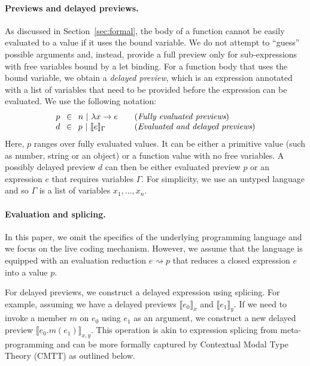 \documentclass[sigplan,10pt]{acmart}\settopmatter{printfolios=true,printccs=false,printacmref=false}
\theoremstyle{plain}
\theoremstyle{definition}
\begin{document}
\paragraph{Previews and delayed previews.}
As discussed in Section~\ref{sec:formal}, the body of a function cannot be easily evaluated to
a value if it uses the bound variable. We do not attempt to ``guess'' possible arguments and,
instead, provide a full preview only for sub-expressions with free variables bound by a let binding.
For a function body that uses the bound variable, we obtain a \emph{delayed preview}, which is
an expression annotated with a list of variables that need to be provided before the expression
can be evaluated. We use the following notation:
%
\begin{equation*}
\begin{array}{rcll}
p&\hspace{-0.25em}\in\hspace{-0.25em}&n~|~\lambda x\rightarrow e&\quad(\textit{Fully evaluated previews})\\
d&\hspace{-0.25em}\in\hspace{-0.25em}&p~|~\llbracket e \rrbracket_\Gamma&\quad(\textit{Evaluated and delayed previews})\\
\end{array}
\end{equation*}
%
Here, $p$ ranges over fully evaluated values. It can be either a primitive value (such as number,
string or an object) or a function value with no free variables. A possibly delayed preview $d$ 
can then be either evaluated preview $p$ or an expression $e$ that requires variables $\Gamma$.
For simplicity, we use an untyped language and so $\Gamma$ is a list of variables $x_1, \ldots, x_n$.

\paragraph{Evaluation and splicing.}
In this paper, we omit the specifics of the underlying programming language and we focus on the
live coding mechanism. However, we assume that the language is equipped with an evaluation 
reduction $e \rightsquigarrow p$ that reduces a closed expression $e$ into a value $p$.

For delayed previews, we construct a delayed expression using splicing. For example, assuming
we have a delayed previews $\llbracket e_0 \rrbracket_x$ and $\llbracket e_1 \rrbracket_y$. 
If we need to invoke a member $m$ on $e_0$ using $e_1$ as an argument, we construct a new 
delayed preview $\llbracket e_0.m(e_1) \rrbracket_{x, y}$. This operation is akin to expression
splicing from meta-programming \cite{metaml,quotations} and can be more formally captured by 
Contextual Modal Type Theory (CMTT) as outlined below.
\end{document}
